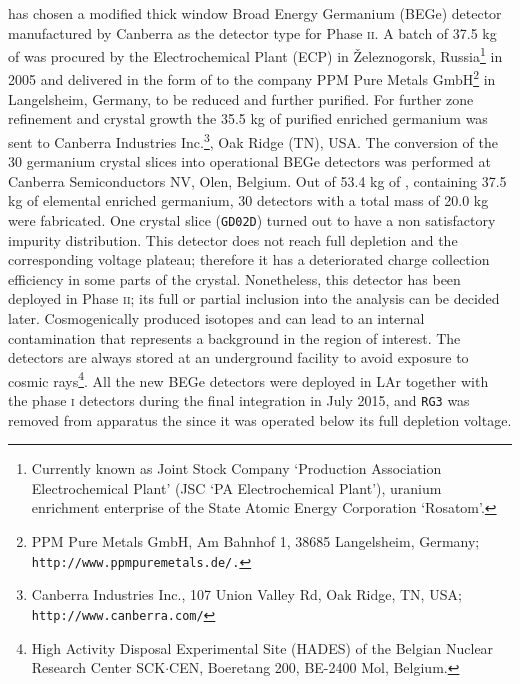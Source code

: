 {\gerda} has chosen a modified thick window Broad Energy Germanium (BEGe) detector manufactured by Canberra as the detector type for Phase \textsc{ii}. A batch of 37.5 kg of  was procured by the Electrochemical Plant (ECP) in Železnogorsk, Russia\footnote{Currently known as Joint Stock Company `Production Association Electrochemical Plant' (JSC `PA Electrochemical Plant'), uranium enrichment enterprise of the State Atomic Energy Corporation `Rosatom'.} in 2005 and delivered in the form of  to the company PPM Pure Metals GmbH\footnote{PPM Pure Metals GmbH, Am Bahnhof 1, 38685 Langelsheim, Germany; \texttt{http://www.ppmpuremetals.de/.}} in Langelsheim, Germany, to be reduced and further purified. For further zone refinement and crystal growth the 35.5 kg of purified enriched germanium was sent to Canberra Industries Inc.\footnote{Canberra Industries Inc., 107 Union Valley Rd, Oak Ridge, TN, USA; \texttt{http://www.canberra.com/}}, Oak Ridge (TN), USA. The conversion of the 30 germanium crystal slices into operational BEGe detectors was performed at Canberra Semiconductors NV, Olen, Belgium. Out of 53.4 kg of , containing 37.5 kg of elemental enriched germanium, 30 detectors with a total mass of 20.0 kg were fabricated. One crystal slice (\texttt{GD02D}) turned out to have a non satisfactory impurity distribution. This detector does not reach full depletion and the corresponding voltage plateau; therefore it has a deteriorated charge collection efficiency in some parts of the crystal. Nonetheless, this detector has been deployed in {\gerda} Phase \textsc{ii}; its full or partial inclusion into the analysis can be decided later. Cosmogenically produced isotopes  and  can lead to an internal contamination that represents a background in the region of interest. The detectors are always stored at an underground facility to avoid exposure to cosmic rays\footnote{High Activity Disposal Experimental Site (HADES) of the Belgian Nuclear Research Center SCK$\cdot$CEN, Boeretang 200, BE-2400 Mol, Belgium.}. All the new BEGe detectors were deployed in LAr together with the phase \textsc{i} detectors during the final integration in July 2015, and \texttt{RG3} was removed from apparatus the since it was operated below its full depletion voltage.


